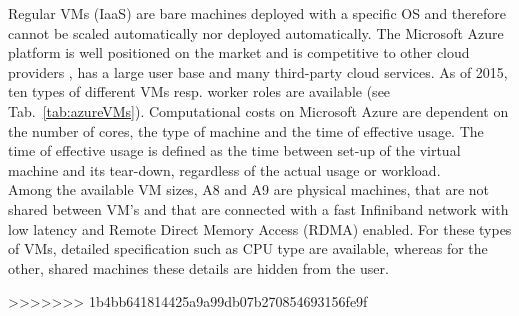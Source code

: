 \documentclass[3p,times]{elsarticle}
\begin{document}
Regular VMs (IaaS) are bare machines deployed with a specific OS and therefore cannot be scaled automatically nor deployed automatically.
The Microsoft Azure platform is well positioned on the market and is competitive to other cloud providers \cite{cloudScores} \cite{twister4azure}, has a large user base and many third-party cloud services. As of 2015, ten types of different VMs resp. worker roles are available (see Tab.~\ref{tab:azureVMs}). Computational costs on Microsoft Azure are dependent on the number of cores, the type of machine and the time of effective usage. The time of effective usage is defined as the time between set-up of the virtual machine and its tear-down, regardless of the actual usage or workload. \\

 
Among the available VM sizes, A8 and A9 are physical machines, that are not shared between VM's and that are connected with a fast Infiniband network with low latency and Remote Direct Memory Access (RDMA) enabled. For these types of VMs, detailed specification such as CPU type are available, whereas for the other, shared machines these details are hidden from the user.
 
>>>>>>> 1b4bb641814425a9a99db07b270854693156fe9f
\end{document}
